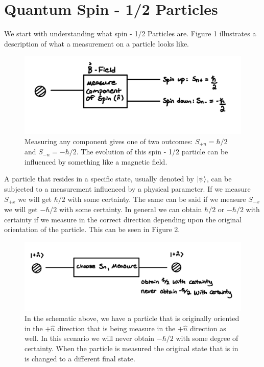 \documentclass[twocolumn]{article}
\begin{document}
\section*{Quantum Spin - 1/2 Particles}
We start with understanding what spin - 1/2 Particles are. Figure 1 illustrates a description of what a measurement on a particle looks like.
\begin{figure}[htbp]
\begin{center}
\includegraphics[width=1.00\linewidth]{Spin-In-Magnetic-Field.jpg}
\caption{Measuring any component gives one of two outcomes: $S_{+n}=\hbar/2$ and $S_{-n}=-\hbar/2$. The evolution of this spin - 1/2 particle can be influenced by something like a magnetic field.}
\end{center}
\end{figure}
\newline
A particle that resides in a specific state, usually denoted by $\ket{\psi}$, can be subjected to a measurement influenced by a physical parameter. If we measure $S_{+x}$ we will get $\hbar/2$ with some certainty. The same can be said if we measure $S_{-x}$ we will get $-\hbar/2$ with some certainty. In general we can obtain $\hbar/2$ or $-\hbar/2$ with certainty if we measure in the correct direction depending upon the original orientation of the particle. This can be seen in Figure 2.
\begin{figure}[htbp]
\begin{center}
\includegraphics[width=1.00\linewidth]{Spin-With-Certainty.jpg}
\caption{In the schematic above, we have a particle that is originally oriented in the $+\hat{n}$ direction that is being measure in the $+\hat{n}$ direction as well. In this scenario we will never obtain $-\hbar/2$ with some degree of certainty. When the particle is measured the original state that is in is changed to a different final state.}
\end{center}
\end{figure}
\end{document}
